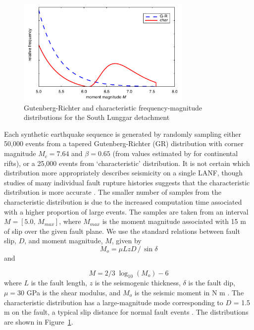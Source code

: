 \documentclass[twocolumn,grl]{AGUTeX}
\begin{document}
\begin{article}
\begin{figure}[b]
\noindent\includegraphics[width=20pc]{./figures/F-Ms.pdf}
\caption{Gutenberg-Richter and characteristic frequency-magnitude 
 		 distributions for the South Lunggar detachment}
\label{fig:fms}
\end{figure}

Each synthetic earthquake sequence is generated by
randomly sampling either 50,000 events from a tapered Gutenberg-Richter (GR)
distribution with corner magnitude $M_c = 7.64$ and $\beta = 0.65$
(from values estimated by \citet{birdkagan2004f_m} for continental
rifts), or a 25,000 events from `characteristic' distribution. It is not
certain which distribution more appropriately describes seismicity on a single
LANF, though studies of many individual fault rupture histories suggests
that the characteristic distribution is more accurate \citep{hecker2013eqdist}.
The smaller number of samples from the characteristic distribution is due to 
the increased computation time associated with a higher proportion of large 
events.  The samples are taken 
from an interval $M = [5.0, \, M_{max}]$, where $M_{max}$ is the
moment magnitude
associated with 15 m of slip over the given fault plane. We use the
standard relations between fault slip, $D$, and moment magnitude, $M$, given by
  \begin{equation}
 M_o = \mu L z D \,/ \, \sin \delta 
 \end{equation}
and


\begin{equation}
M = 2/3 \; \log_{10} (M_o) - 6
\end{equation}
where $L$ is the fault length, $z$ is the seismogenic thickness, $\delta$ is the fault dip,
$\mu = 30$ GPa is the shear modulus, and $M_o$ is the seismic
moment in N m \citep{kagan2003pepi}.  The characteristic distribution has a
large-magnitude mode corresponding to $D$ = 1.5 m on the fault, a typical
slip distance for normal fault events \citep[e.g.][]{wesnousky2008displacement}.
The distributions are shown in Figure~\ref{fig:fms}.


\end{article}
\end{document}
